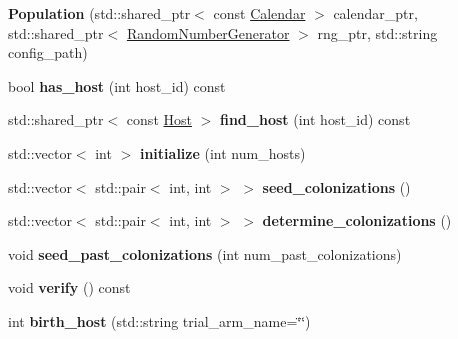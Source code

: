 \begin{DoxyCompactItemize}
\item 
\mbox{\label{class_population_a5fc7a00f0057d03c8b3cdbe74558ba52}} 
{\bfseries Population} (std\+::shared\+\_\+ptr$<$ const \hyperlink{class_calendar}{Calendar} $>$ calendar\+\_\+ptr, std\+::shared\+\_\+ptr$<$ \hyperlink{class_random_number_generator}{Random\+Number\+Generator} $>$ rng\+\_\+ptr, std\+::string config\+\_\+path)
\item 
\mbox{\label{class_population_a795206369ee584c0c1451eae124650d6}} 
bool {\bfseries has\+\_\+host} (int host\+\_\+id) const
\item 
\mbox{\label{class_population_a49655a081dcd91772d72e764ed505602}} 
std\+::shared\+\_\+ptr$<$ const \hyperlink{class_host}{Host} $>$ {\bfseries find\+\_\+host} (int host\+\_\+id) const
\item 
\mbox{\label{class_population_a4148c12da584f3ccb9fb737dc0487df7}} 
std\+::vector$<$ int $>$ {\bfseries initialize} (int num\+\_\+hosts)
\item 
\mbox{\label{class_population_ad9bd50ce1cb35e3dcdd1244057973b7c}} 
std\+::vector$<$ std\+::pair$<$ int, int $>$ $>$ {\bfseries seed\+\_\+colonizations} ()
\item 
\mbox{\label{class_population_ab7eefdbcf57813e2eb903e914223dda4}} 
std\+::vector$<$ std\+::pair$<$ int, int $>$ $>$ {\bfseries determine\+\_\+colonizations} ()
\item 
\mbox{\label{class_population_a676fb6dd79bef478f540aadbd8310eb7}} 
void {\bfseries seed\+\_\+past\+\_\+colonizations} (int num\+\_\+past\+\_\+colonizations)
\item 
\mbox{\label{class_population_a9c5fdd1a32ce33f6bd5e1bc978aab799}} 
void {\bfseries verify} () const
\item 
\mbox{\label{class_population_a6c3f3d845734d899d842908f4086b211}} 
int {\bfseries birth\+\_\+host} (std\+::string trial\+\_\+arm\+\_\+name=\char`\"{}\char`\"{})
\item 

\end{DoxyCompactItemize}
